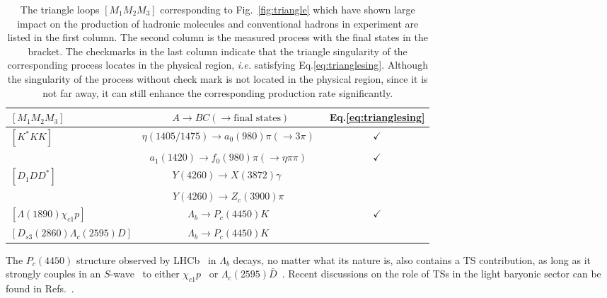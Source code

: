 \begin{table*}
\caption{The triangle loops $[M_1M_2M_3]$ corresponding to
Fig.~\ref{fig:triangle}
which have shown large impact on the production of hadronic molecules
and conventional hadrons in experiment are listed in the first column.
The second column is the measured process with the final states in the bracket.
The checkmarks in the last column indicate that the triangle singularity of the
corresponding process locates in the physical region, {\sl i.e.} satisfying
Eq.\eqref{eq:trianglesing}. Although  the singularity of the process without
check mark is not located in the physical region, since it is not far away, it
can still enhance the corresponding production rate significantly.
 }
\begin{ruledtabular}
\begin{tabular}{ l c c }
$[M_{1}M_{2}M_{3}]$ & $A\to BC(\to\text{final states})$ &
Eq.\eqref{eq:trianglesing}\tabularnewline
\hline
$[K^{*}KK]$ & $\eta(1405/1475)\to
a_{0}(980)\pi(\to3\pi)$~\cite{Wu:2011yx,Wu:2012pg} & $\checkmark$\tabularnewline
 & $a_{1}(1420)\to
f_{0}(980)\pi(\to\eta\pi\pi)$~\cite{Ketzer:2015tqa,Liu:2015taa} &
$\checkmark$\tabularnewline
\hline
$[D_{1}DD^{*}]$ & $Y(4260)\to X(3872)\gamma$ ~\cite{Guo:2013nza} &
\tabularnewline
 & $Y(4260)\to
Z_{c}(3900)\pi$~\cite{Wang:2013cya,Wang:2013hga,Szczepaniak:2015eza,
Gong:2016jzb} & \tabularnewline
\hline
$[\Lambda(1890)\chi_{c1}p]$ & $\Lambda_{b}\to
P_{c}(4450)K$~\cite{Guo:2015umn,Liu:2015fea,Bayar:2016ftu} &
$\checkmark$\tabularnewline
\hline
$[D_{s3}(2860)\Lambda_{c}(2595)D]$ & $\Lambda_{b}\to
P_{c}(4450)K$~\cite{Liu:2015fea} & \tabularnewline
\end{tabular}
\end{ruledtabular}
\label{tab:trianglesingularity}
\end{table*}


The $P_c(4450)$  structure observed by LHCb~\cite{Aaij:2015tga} in
$\Lambda_b$ decays, no matter what its nature is, also contains a TS
contribution, as long as it strongly couples in an
$S$-wave~\cite{Bayar:2016ftu} to either
$\chi_{c1}p$~\cite{Guo:2015umn,Liu:2015fea,Guo:2016bkl,
Meissner:2015mza}  or $\Lambda_c(2595)\bar D$~\cite{Liu:2015fea}.
Recent discussions on the role of TSs in the
light baryonic sector can be found in Refs.~\cite{Wang:2016dtb,Roca:2017bvy,
Debastiani:2017dlz,Samart:2017scf}.



